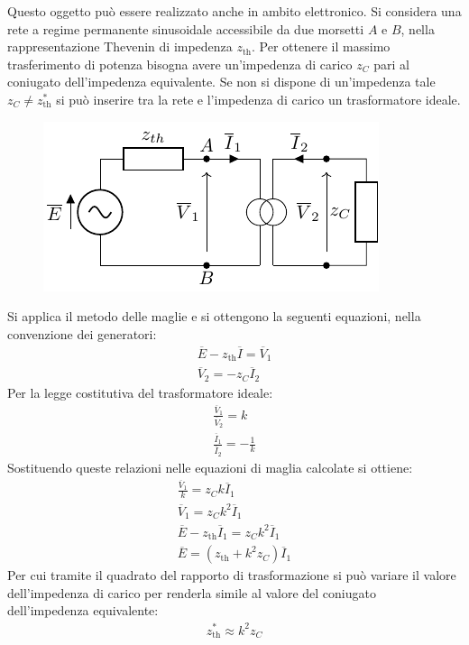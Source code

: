 \documentclass{article}
\numberwithin{equation}{subsection}
\begin{document}
Questo oggetto può essere realizzato anche in ambito elettronico. Si considera una rete a regime permanente sinusoidale accessibile da due morsetti $A$ e $B$, nella 
rappresentazione Thevenin di impedenza $z_\mathrm{th}$. Per ottenere il massimo trasferimento di potenza bisogna avere un'impedenza di carico $z_C$ pari al coniugato dell'impedenza 
equivalente. Se non si dispone di un'impedenza tale $z_C\neq z_\mathrm{th}^*$ si può inserire tra la rete e l'impedenza di carico un trasformatore ideale. 
\begin{figure}[H]%
    \centering
    \includegraphics{potenza-trasformatore.pdf}%
    \label{fig:trasformatore-carico}
\end{figure}
Si applica il metodo delle maglie e si ottengono la seguenti equazioni, nella convenzione dei generatori:
\begin{gather*}
    \overline{E}-z_\mathrm{th}\overline{I}=\overline{V}_1\\
    \overline{V}_2=-z_C\overline{I}_2
\end{gather*}
Per la legge costitutiva del trasformatore ideale:
\begin{gather*}
    \displaystyle\frac{\overline{V}_1}{\overline{V}_2}=k\\
    \displaystyle\frac{\overline{I}_1}{\overline{I}_2}=-\frac{1}{k}
\end{gather*}
Sostituendo queste relazioni nelle equazioni di maglia calcolate si ottiene:
\begin{gather*}
    \displaystyle\frac{\overline{V}_1}{k}=z_Ck\overline{I}_1\\
    \overline{V}_1=z_Ck^2\overline{I}_1\\
    \overline{E}-z_\mathrm{th}\overline{I}_1=z_Ck^2\overline{I}_1\\
    \overline{E}=(z_\mathrm{th}+k^2z_C)\overline{I}_1
\end{gather*}
Per cui tramite il quadrato del rapporto di trasformazione si può variare il valore dell'impedenza di carico per renderla simile al valore del coniugato dell'impedenza 
equivalente:
\begin{gather*}
    z_\mathrm{th}^*\approx k^2z_C
\end{gather*}
\end{document}
